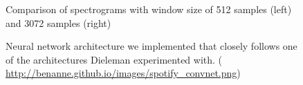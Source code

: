 \documentclass[11pt, a4paper]{article}
\begin{document}
    \begin{figure}
      \centering
      \caption{Comparison of spectrograms with window size of 512 samples
          (left) and 3072 samples (right)}
    \end{figure}

    \begin{figure}
      \centering
      \caption{Neural network architecture we implemented that closely follows
        one of the architectures Dieleman experimented with.
        (\url{ http://benanne.github.io/images/spotify\_convnet.png})}
    \end{figure}
\end{document}

